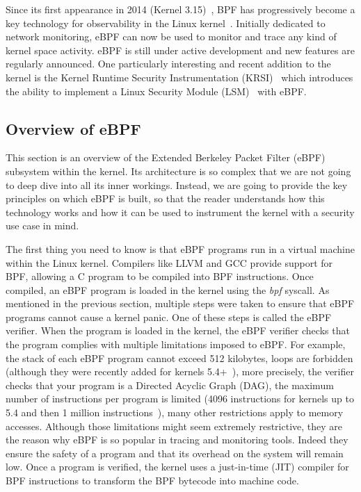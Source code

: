 Since its first appearance in 2014 (Kernel 3.15)~\cite{RuntimeSecurityMonitoringWithEBPF:VirtualMachine}, BPF has progressively become a key technology for observability in the Linux kernel~\cite{RuntimeSecurityMonitoringWithEBPF:BrendanGregg}.
Initially dedicated to network monitoring, eBPF can now be used to monitor and trace any kind of kernel space activity.
eBPF is still under active development and new features are regularly announced.
One particularly interesting and recent addition to the kernel is the Kernel Runtime Security Instrumentation (KRSI)~\cite{RuntimeSecurityMonitoringWithEBPF:KRSI} which introduces the ability to implement a Linux Security Module (LSM)~\cite{RuntimeSecurityMonitoringWithEBPF:SecurityModule} with eBPF.

\subsection{Overview of eBPF}

This section is an overview of the Extended Berkeley Packet Filter (eBPF) subsystem within the kernel.
Its architecture is so complex that we are not going to deep dive into all its inner workings.
Instead, we are going to provide the key principles on which eBPF is built, so that the reader understands how this technology works and how it can be used to instrument the kernel with a security use case in mind.

The first thing you need to know is that eBPF programs run in a virtual machine within the Linux kernel.
Compilers like LLVM and GCC provide support for BPF, allowing a C program to be compiled into BPF instructions.
Once compiled, an eBPF program is loaded in the kernel using the \emph{bpf} syscall.
As mentioned in the previous section, multiple steps were taken to ensure that eBPF programs cannot cause a kernel panic.
One of these steps is called the eBPF verifier.
When the program is loaded in the kernel, the eBPF verifier checks that the program complies with multiple limitations imposed to eBPF.
For example, the stack of each eBPF program cannot exceed 512 kilobytes, loops are forbidden (although they were recently added for kernels 5.4+~\cite{RuntimeSecurityMonitoringWithEBPF:Loops}), more precisely, the verifier checks that your program is a Directed Acyclic Graph (DAG), the maximum number of instructions per program is limited (4096 instructions for kernels up to 5.4 and then 1 million instructions~\cite{RuntimeSecurityMonitoringWithEBPF:VerifierScalability}), many other restrictions apply to memory accesses.
Although those limitations might seem extremely restrictive, they are the reason why eBPF is so popular in tracing and monitoring tools.
Indeed they ensure the safety of a program and that its overhead on the system will remain low.
Once a program is verified, the kernel uses a just-in-time (JIT) compiler for BPF instructions to transform the BPF bytecode into machine code.

